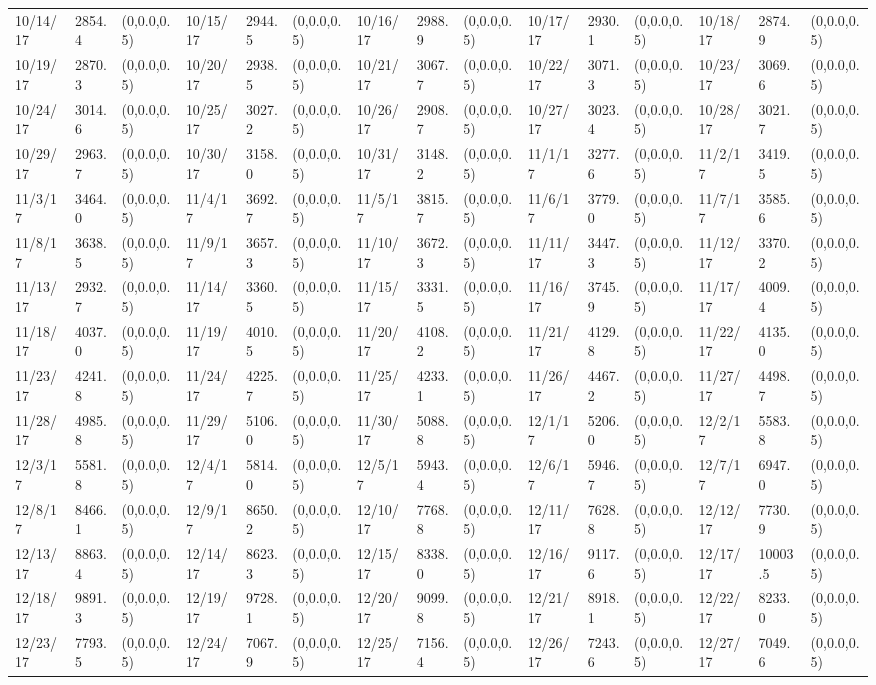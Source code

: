 \documentclass[12pt]{article}
\begin{document}
\begin{table}
\begin{center}
\begin{tabular}{p{15pt}p{15pt}p{25pt}p{15pt}p{15pt}p{25pt}p{15pt}p{15pt}p{25pt}p{15pt}p{15pt}p{25pt}p{15pt}p{15pt}p{25pt}}
    10/14/17&2854.4&(0,0.0,0.5)&10/15/17&2944.5&(0,0.0,0.5)&10/16/17&2988.9&(0,0.0,0.5)&10/17/17&2930.1&(0,0.0,0.5)&10/18/17&2874.9&(0,0.0,0.5)\\
    10/19/17&2870.3&(0,0.0,0.5)&10/20/17&2938.5&(0,0.0,0.5)&10/21/17&3067.7&(0,0.0,0.5)&10/22/17&3071.3&(0,0.0,0.5)&10/23/17&3069.6&(0,0.0,0.5)\\
    10/24/17&3014.6&(0,0.0,0.5)&10/25/17&3027.2&(0,0.0,0.5)&10/26/17&2908.7&(0,0.0,0.5)&10/27/17&3023.4&(0,0.0,0.5)&10/28/17&3021.7&(0,0.0,0.5)\\
    10/29/17&2963.7&(0,0.0,0.5)&10/30/17&3158.0&(0,0.0,0.5)&10/31/17&3148.2&(0,0.0,0.5)&11/1/17&3277.6&(0,0.0,0.5)&11/2/17&3419.5&(0,0.0,0.5)\\
    11/3/17&3464.0&(0,0.0,0.5)&11/4/17&3692.7&(0,0.0,0.5)&11/5/17&3815.7&(0,0.0,0.5)&11/6/17&3779.0&(0,0.0,0.5)&11/7/17&3585.6&(0,0.0,0.5)\\
    11/8/17&3638.5&(0,0.0,0.5)&11/9/17&3657.3&(0,0.0,0.5)&11/10/17&3672.3&(0,0.0,0.5)&11/11/17&3447.3&(0,0.0,0.5)&11/12/17&3370.2&(0,0.0,0.5)\\
    11/13/17&2932.7&(0,0.0,0.5)&11/14/17&3360.5&(0,0.0,0.5)&11/15/17&3331.5&(0,0.0,0.5)&11/16/17&3745.9&(0,0.0,0.5)&11/17/17&4009.4&(0,0.0,0.5)\\
    11/18/17&4037.0&(0,0.0,0.5)&11/19/17&4010.5&(0,0.0,0.5)&11/20/17&4108.2&(0,0.0,0.5)&11/21/17&4129.8&(0,0.0,0.5)&11/22/17&4135.0&(0,0.0,0.5)\\
    11/23/17&4241.8&(0,0.0,0.5)&11/24/17&4225.7&(0,0.0,0.5)&11/25/17&4233.1&(0,0.0,0.5)&11/26/17&4467.2&(0,0.0,0.5)&11/27/17&4498.7&(0,0.0,0.5)\\
    11/28/17&4985.8&(0,0.0,0.5)&11/29/17&5106.0&(0,0.0,0.5)&11/30/17&5088.8&(0,0.0,0.5)&12/1/17&5206.0&(0,0.0,0.5)&12/2/17&5583.8&(0,0.0,0.5)\\
    12/3/17&5581.8&(0,0.0,0.5)&12/4/17&5814.0&(0,0.0,0.5)&12/5/17&5943.4&(0,0.0,0.5)&12/6/17&5946.7&(0,0.0,0.5)&12/7/17&6947.0&(0,0.0,0.5)\\
    12/8/17&8466.1&(0,0.0,0.5)&12/9/17&8650.2&(0,0.0,0.5)&12/10/17&7768.8&(0,0.0,0.5)&12/11/17&7628.8&(0,0.0,0.5)&12/12/17&7730.9&(0,0.0,0.5)\\
    12/13/17&8863.4&(0,0.0,0.5)&12/14/17&8623.3&(0,0.0,0.5)&12/15/17&8338.0&(0,0.0,0.5)&12/16/17&9117.6&(0,0.0,0.5)&12/17/17&10003.5&(0,0.0,0.5)\\
    12/18/17&9891.3&(0,0.0,0.5)&12/19/17&9728.1&(0,0.0,0.5)&12/20/17&9099.8&(0,0.0,0.5)&12/21/17&8918.1&(0,0.0,0.5)&12/22/17&8233.0&(0,0.0,0.5)\\
    12/23/17&7793.5&(0,0.0,0.5)&12/24/17&7067.9&(0,0.0,0.5)&12/25/17&7156.4&(0,0.0,0.5)&12/26/17&7243.6&(0,0.0,0.5)&12/27/17&7049.6&(0,0.0,0.5)\\

\end{tabular}
\end{center}
\end{table}
\end{document}
